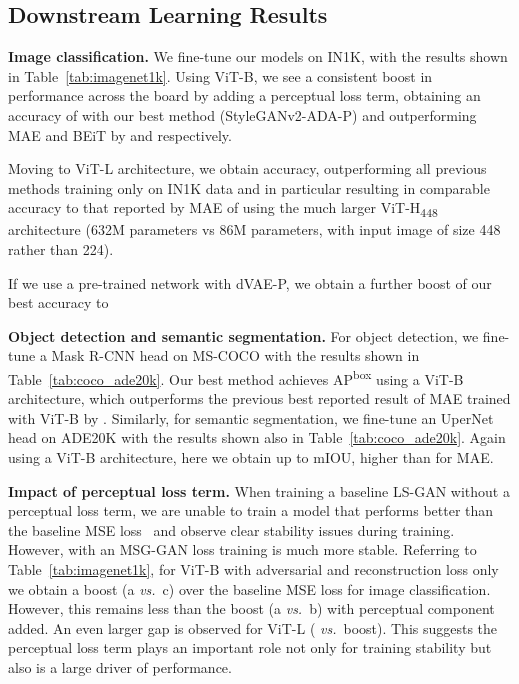 \documentclass[10pt,twocolumn,letterpaper, cta-author]{article}
\begin{document}
\subsection{Downstream Learning Results}
\label{transfer_results}



\textbf{Image classification.} We fine-tune our models on IN1K, with the results shown in Table~\ref{tab:imagenet1k}. Using ViT-B, we see a consistent boost in performance across the board by adding a perceptual loss term, obtaining an accuracy of  with our best method (StyleGANv2-ADA-P) and outperforming MAE and BEiT by  and  respectively.

Moving to ViT-L architecture, we obtain  accuracy, outperforming all previous methods training only on IN1K data and in particular resulting in comparable accuracy to that reported by MAE of  using the much larger ViT-H\textsubscript{448} architecture (632M parameters vs 86M parameters, with input image of size 448 rather than 224).

If we use a pre-trained network with dVAE-P, we obtain a further boost of our best accuracy to 

\textbf{Object detection and semantic segmentation.} For object detection, we fine-tune a Mask R-CNN head on MS-COCO with the results shown in Table~\ref{tab:coco_ade20k}. Our best method achieves  AP\textsuperscript{box} using a ViT-B architecture, which outperforms the previous best reported result of MAE trained with ViT-B by . Similarly, for semantic segmentation, we fine-tune an UperNet head on ADE20K with the results shown also in Table~\ref{tab:coco_ade20k}. Again using a ViT-B architecture, here we obtain up to  mIOU,  higher than for MAE.

\textbf{Impact of perceptual loss term.} When training a baseline LS-GAN without a perceptual loss term, we are unable to train a model that performs better than the baseline MSE loss~\cite{MaskedAutoencoders2021} and observe clear stability issues during training. However, with an MSG-GAN loss training is much more stable. Referring to Table~\ref{tab:imagenet1k}, for ViT-B with adversarial and reconstruction loss only we obtain a  boost (a \emph{vs.}\ c) over the baseline MSE loss for image classification. However, this remains less than the  boost (a \emph{vs.}\ b) with perceptual component added. An even larger gap is observed for ViT-L ( \emph{vs.}\  boost). This suggests the perceptual loss term plays an important role not only for training stability but also is a large driver of performance.
\end{document}
